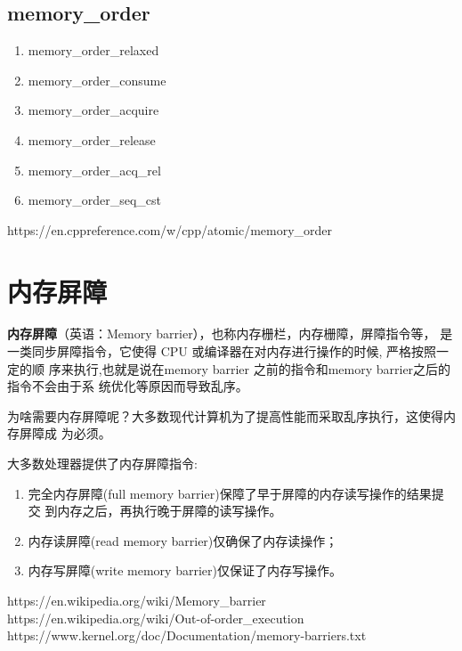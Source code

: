 \subsection{memory\_order}

\begin{enumerate}
  \item memory\_order\_relaxed
  \item memory\_order\_consume
  \item memory\_order\_acquire
  \item memory\_order\_release
  \item memory\_order\_acq\_rel
  \item memory\_order\_seq\_cst
\end{enumerate}

https://en.cppreference.com/w/cpp/atomic/memory\_order

\section{内存屏障}

\textbf{内存屏障}（英语：Memory barrier），也称内存栅栏，内存栅障，屏障指令等，
是一类同步屏障指令，它使得 CPU 或编译器在对内存进行操作的时候, 严格按照一定的顺
序来执行,也就是说在memory barrier 之前的指令和memory barrier之后的指令不会由于系
统优化等原因而导致乱序。

为啥需要内存屏障呢？大多数现代计算机为了提高性能而采取乱序执行，这使得内存屏障成
为必须。

大多数处理器提供了内存屏障指令:

\begin{enumerate}
  \item 完全内存屏障(full memory barrier)保障了早于屏障的内存读写操作的结果提交
    到内存之后，再执行晚于屏障的读写操作。
  \item 内存读屏障(read memory barrier)仅确保了内存读操作；
  \item 内存写屏障(write memory barrier)仅保证了内存写操作。
\end{enumerate}

https://en.wikipedia.org/wiki/Memory\_barrier \\
https://en.wikipedia.org/wiki/Out-of-order\_execution \\
https://www.kernel.org/doc/Documentation/memory-barriers.txt

